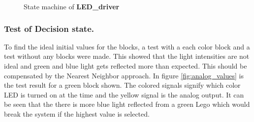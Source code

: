 \begin{figure}[h]
\centering
 \caption{State machine of \textbf{LED\_driver}}
 \label{fig::state_led}
\end{figure}

\subsubsection{Test of Decision state.}\label{sec:system_test}
To find the ideal initial values for the blocks, a test with a each color block and a test without any blocks were made.
This showed that the light intensities are not ideal and green and blue light gets reflected more than expected.
This should be compensated by the Nearest Neighbor approach.
In figure \ref{fig:analog_values} is the test result for a green block shown.
The colored signals signify which color LED is turned on at the time and the yellow signal is the analog output.
It can be seen that the there is more blue light reflected from a green Lego which would break the system if the highest value is selected.

